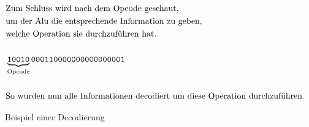 \documentclass[paper=a4,fontsize=12pt,twocolumn]{scrreprt}
\begin{document}
\begin{figure*}[h]
\begin{align*}
        &\text{Zum Schluss wird nach dem Opcode geschaut,}\\
        &\text{um der Alu die entsprechende Information zu geben,}\\
        &\text{welche Operation sie durchzuführen hat.}\\
        &\text{\newline}\\
        &\underbrace{\texttt{10010}}_\text{Opcode}\texttt{000110000000000000001}\\
        &\text{\newline}\\
        &\text{So wurden nun alle Informationen decodiert um diese Operation durchzuführen.}
        &\text{\newline}\\
    \end{align*}
    \caption{Beispiel einer Decodierung}
    \label{fig:beispiel_einer_decodierung}
\end{figure*}
\end{document}
